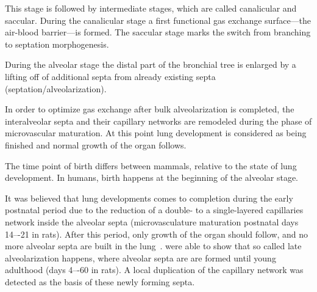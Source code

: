 This stage is followed by intermediate stages, which are called ca\-na\-li\-cular and saccular. During the canalicular stage a first functional gas exchange surface---the air-blood barrier---is formed. The saccular stage marks the switch from branching to septation morphogenesis.

During the alveolar stage the distal part of the bronchial tree is enlarged by a lifting off of additional septa from already existing septa (septation/alveolarization). 

In order to optimize gas exchange after bulk alveolarization is completed, the interalveolar septa and their capillary networks are remodeled during the phase of microvascular maturation. At this point lung development is considered as being finished and normal growth of the organ follows.

The time point of birth differs between mammals, relative to the state of lung development. In humans, birth happens at the beginning of the alveolar stage.

It was believed that lung developments comes to completion during the early postnatal period due to the reduction of a double- to a single-layered capillaries network inside the alveolar septa (microvasculature maturation postnatal days 14–-21 in rats). After this period, only growth of the organ should follow, and no more alveolar septa are built in the lung~\cite{Burri1999,Schittny2004}. \citet{Schittny2008} were able to show that so called late alveolarization happens, where alveolar septa are are formed until young adulthood (days 4–-60 in rats). A local duplication of the capillary network was detected as the basis of these newly forming septa.
